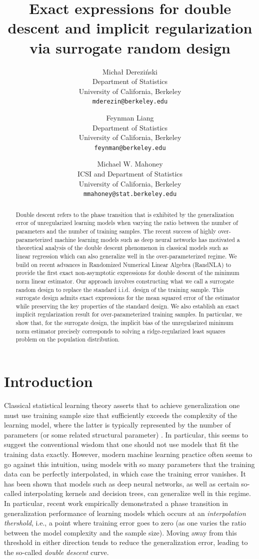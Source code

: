 \documentclass[11pt]{article}
\title{Exact expressions for double descent
and implicit regularization
\\
via surrogate random design}
\author{%
          Micha{\l } Derezi\'{n}ski \\
  Department of Statistics\\
  University of California, Berkeley\\
  \texttt{mderezin@berkeley.edu}\\
  \and
  Feynman Liang \\
  Department of Statistics\\
  University of California, Berkeley\\
  \texttt{feynman@berkeley.edu}
  \and
   Michael W. Mahoney\\
  ICSI and Department of Statistics\\
  University of California, Berkeley\\
  \texttt{mmahoney@stat.berkeley.edu}
 }
\begin{document}
\maketitle

\begin{abstract}
  Double descent refers to the phase transition that is exhibited by
  the generalization error of unregularized learning models when varying the ratio
  between the number of parameters and the number of training
  samples. The recent success of highly over-parameterized machine learning
  models such as deep neural networks has motivated a theoretical analysis of
  the double descent phenomenon in classical models such as linear
  regression which can also generalize well in the over-parameterized
  regime. We build on recent advances in Randomized Numerical Linear
  Algebra (RandNLA) to provide the first exact non-asymptotic
  expressions for double descent of the minimum norm linear
  estimator. Our approach involves constructing
  what we call a surrogate random design to replace the standard
  i.i.d.~design of the training sample. This surrogate design admits
  exact expressions for the mean squared error of the estimator while
  preserving the key properties of the standard design. 
  We also establish an exact implicit regularization result for
over-parameterized training samples. In particular, we show that, for 
the surrogate design, the implicit bias of the unregularized minimum
norm estimator precisely corresponds to solving a ridge-regularized
least squares problem on the population distribution. 
\end{abstract}


\section{Introduction}

Classical statistical learning theory asserts that to achieve generalization one must use training sample size that sufficiently exceeds the complexity of the learning model, where the latter is typically represented by the number of parameters (or some related structural parameter) \cite{HFT09}. 
In particular, this seems to suggest the conventional wisdom that one should not use models that fit the training data exactly. 
However, modern machine learning
practice often seems to go against this intuition, using models with so many
parameters that the training data can be perfectly interpolated, in which case
the training error vanishes. It has been shown that 
models such as deep neural networks, as well as certain so-called interpolating kernels and decision
trees, can generalize well in this regime. In particular, recent work \cite{BHMM19}
empirically demonstrated a phase transition in generalization
performance of learning models which occurs at an
\emph{interpolation thershold}, i.e., a point where training error
goes to zero (as one varies the ratio between the model complexity and
the sample size). Moving away from this threshold in 
either direction tends to reduce the generalization error, leading to
the so-called \emph{double descent} curve. 
\end{document}
